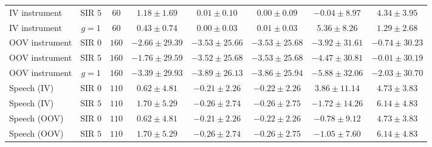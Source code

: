 \begin{table}[t]
{\begin{tabular}{@{}lccccccc@{}}
        IV instrument
        & SIR $5$
        & $60$
        & $1.18 \pm 1.69$
        & $0.01 \pm 0.10$
        & $0.00 \pm 0.09$
        & $-0.04 \pm 8.97$
        & $\mathbf{4.34 \pm 3.95}$
        \\

        IV instrument
        & $g=1$
        & $60$
        & $0.43 \pm 0.74$
        & $0.00 \pm 0.03$
        & $0.01 \pm 0.03$
        & $\mathbf{5.36 \pm 8.26}$
        & $1.29 \pm 2.68$
        \\

        OOV instrument
        & SIR $0$
        & $160$
        & $-2.66 \pm 29.39$
        & $-3.53 \pm 25.66$
        & $-3.53 \pm 25.68$
        & $-3.92 \pm 31.61$
        & $\mathbf{-0.74 \pm 30.23}$
        \\

        OOV instrument
        & SIR $5$
        & $160$
        & $-1.76 \pm 29.59$
        & $-3.52 \pm 25.68$
        & $-3.53 \pm 25.68$
        & $-4.47 \pm 30.81$
        & $\mathbf{-0.01 \pm 30.19}$
        \\

        OOV instrument
        & $g=1$
        & $160$
        & $-3.39 \pm 29.93$
        & $-3.89 \pm 26.13$
        & $-3.86 \pm 25.94$
        & $-5.88 \pm 32.06$
        & $\mathbf{-2.03 \pm 30.70}$
        \\

        Speech (IV)
        & SIR $0$
        & $110$
        & $0.62 \pm 4.81$
        & $-0.21 \pm 2.26$
        & $-0.22 \pm 2.26$
        & $3.86 \pm 11.14$
        & $\mathbf{4.73 \pm 3.83}$
        \\

        Speech (IV)
        & SIR $5$
        & $110$
        & $1.70 \pm 5.29$
        & $-0.26 \pm 2.74$
        & $-0.26 \pm 2.75$
        & $-1.72 \pm 14.26$
        & $\mathbf{6.14 \pm 4.83}$
        \\

        Speech (OOV)
        & SIR $0$
        & $110$
        & $0.62 \pm 4.81$
        & $-0.21 \pm 2.26$
        & $-0.22 \pm 2.26$
        & $-0.78 \pm 9.12$
        & $\mathbf{4.73 \pm 3.83}$
        \\

        Speech (OOV)
        & SIR $5$
        & $110$
        & $1.70 \pm 5.29$
        & $-0.26 \pm 2.74$
        & $-0.26 \pm 2.75$
        & $-1.05 \pm 7.60$
        & $\mathbf{6.14 \pm 4.83}$
        \\


\end{tabular}}
\end{table}
